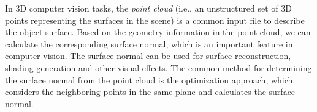 %
%
%


In 3D computer vision tasks, the \textit{point cloud} (i.e., an unstructured set of 3D points representing the surfaces in the scene) is a common input file to describe the object surface. Based on the geometry information in the point cloud, we can calculate the corresponding surface normal, which is an important feature in computer vision. The surface normal can be used for surface reconstruction, shading generation and other visual effects. The common method for determining the surface normal from the point cloud is the optimization approach, which considers the neighboring points in the same plane and calculates the surface normal. 

